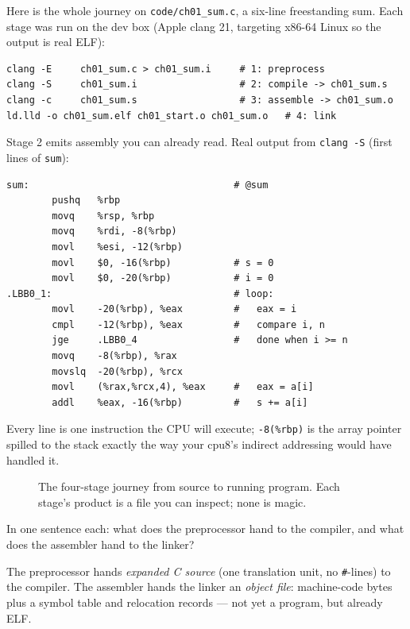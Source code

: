 \begin{example}
\label{ex:pipeline}
Here is the whole journey on \texttt{code/ch01\_sum.c}, a six-line
freestanding sum. Each stage was run on the dev box
(Apple clang 21, targeting x86-64 Linux so the output is real ELF):

\begin{lstlisting}[basicstyle=\ttfamily\scriptsize]
clang -E     ch01_sum.c > ch01_sum.i     # 1: preprocess
clang -S     ch01_sum.i                  # 2: compile -> ch01_sum.s
clang -c     ch01_sum.s                  # 3: assemble -> ch01_sum.o
ld.lld -o ch01_sum.elf ch01_start.o ch01_sum.o   # 4: link
\end{lstlisting}

Stage 2 emits assembly you can already read. Real output from
\texttt{clang -S} (first lines of \texttt{sum}):

\begin{lstlisting}[basicstyle=\ttfamily\scriptsize]
sum:                                    # @sum
        pushq   %rbp
        movq    %rsp, %rbp
        movq    %rdi, -8(%rbp)
        movl    %esi, -12(%rbp)
        movl    $0, -16(%rbp)           # s = 0
        movl    $0, -20(%rbp)           # i = 0
.LBB0_1:                                # loop:
        movl    -20(%rbp), %eax         #   eax = i
        cmpl    -12(%rbp), %eax         #   compare i, n
        jge     .LBB0_4                 #   done when i >= n
        movq    -8(%rbp), %rax
        movslq  -20(%rbp), %rcx
        movl    (%rax,%rcx,4), %eax     #   eax = a[i]
        addl    %eax, -16(%rbp)         #   s += a[i]
\end{lstlisting}

Every line is one instruction the CPU will execute; \texttt{-8(\%rbp)}
is the array pointer spilled to the stack exactly the way your cpu8's
indirect addressing would have handled it.
\end{example}

\begin{figure}[htbp]
\centering

\caption{The four-stage journey from source to running program. Each
stage's product is a file you can inspect; none is magic.}
\label{fig:pipeline01}
\end{figure}

\begin{checkpoint}
In one sentence each: what does the preprocessor hand to the compiler,
and what does the assembler hand to the linker?
\end{checkpoint}
\begin{solution}
The preprocessor hands \emph{expanded C source} (one translation unit,
no \texttt{\#}-lines) to the compiler. The assembler hands the linker an
\emph{object file}: machine-code bytes plus a symbol table and
relocation records --- not yet a program, but already ELF.
\end{solution}

